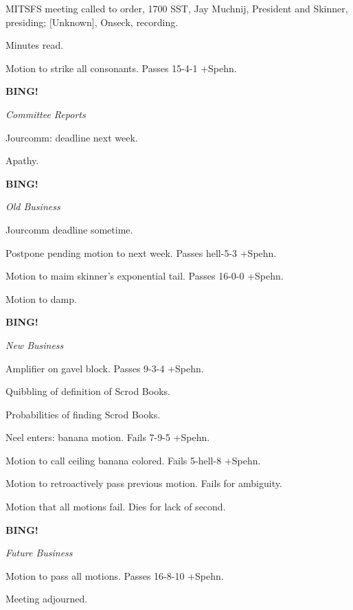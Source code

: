 \documentclass[12pt]{article}
\newcommand{\bing}{{\bf BING!} }
\newcommand{\goto}[1]{\bing \vskip 12pt \centerline{{\em{#1}}}}
\begin{document}
\vspace{18pt}

\setlength{\parskip}{6pt}

\noindent
MITSFS meeting called to order, 1700 SST, Jay Muchnij, President and Skinner, presiding; [Unknown], Onseck, recording.

Minutes read.

Motion to strike all consonants. Passes 15-4-1 +Spehn.

\goto{Committee Reports}

Jourcomm: deadline next week.

Apathy.

\goto{Old Business}

Jourcomm deadline sometime.

Postpone pending motion to next week. Passes hell-5-3 +Spehn.

Motion to maim skinner's exponential tail. Passes 16-0-0 +Spehn.

Motion to damp.

\goto{New Business}

Amplifier on gavel block. Passes 9-3-4 +Spehn.

Quibbling of definition of Scrod Books.

Probabilities of finding Scrod Books.

Neel enters: banana motion. Fails 7-9-5 +Spehn.

Motion to call ceiling banana colored. Fails 5-hell-8 +Spehn.

Motion to retroactively pass previous motion. Fails for ambiguity.

Motion that all motions fail. Dies for lack of second.

\goto{Future Business}

Motion to pass all motions. Passes 16-8-10 +Spehn.

\vspace{12pt}

\noindent
Meeting adjourned.
\end{document}
